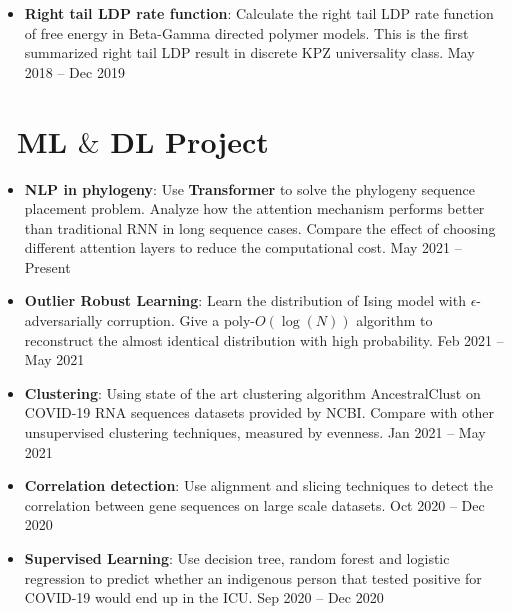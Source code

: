 \documentclass{resume}
\begin{document}
\begin{spacing}{1.0}
		\begin{itemize}
			\item \textbf{Right tail LDP rate function}: Calculate the right tail LDP rate function of free energy in Beta-Gamma directed polymer models.  This is the first summarized right tail LDP result in discrete KPZ universality class. \hfill May 2018 -- Dec 2019
		\end{itemize}
		
		
		
		
		\section{\faCogs\ ML $\&$ DL Project}
		
		\begin{itemize}
			\item \textbf{NLP in phylogeny}: Use \textbf{Transformer} to solve the phylogeny sequence placement problem. Analyze how the attention mechanism performs better than traditional RNN in long sequence cases. Compare the effect of choosing different attention layers to reduce the computational cost. \hfill May 2021 -- Present
			\vspace{0.05in}
			
			\item \textbf{Outlier Robust Learning}: Learn the distribution of Ising model with $\epsilon$-adversarially corruption. Give a poly-$O(\log (N))$ algorithm to reconstruct the almost identical distribution with high probability.    \hfill Feb 2021 -- May 2021
			\vspace{0.05in} 
			
			\item \textbf{Clustering}: Using state of the art clustering algorithm AncestralClust on COVID-19 RNA sequences datasets provided by NCBI. Compare with other unsupervised clustering techniques, measured by evenness. \hfill  Jan 2021 -- May 2021
			\vspace{0.05in}
			
			\item \textbf{Correlation detection}: Use alignment and slicing techniques to detect the correlation between gene sequences on large scale datasets. \hfill  Oct 2020 -- Dec 2020
			
			\vspace{0.05in}
			
			\item \textbf{Supervised Learning}: Use decision tree, random forest and logistic regression to predict whether an indigenous person that tested positive for COVID-19 would end up in the ICU. \hfill  Sep 2020 -- Dec 2020
		\end{itemize}
		
	\end{spacing}
\end{document}
